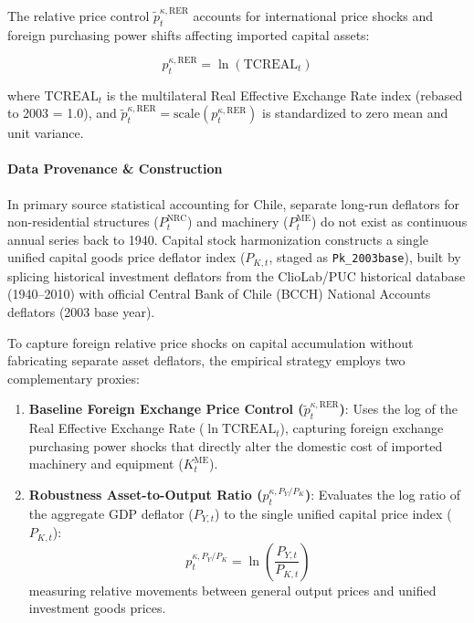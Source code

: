 The relative price control $\tilde{p}_t^{\kappa, \text{RER}}$ accounts for international price shocks and foreign purchasing power shifts affecting imported capital assets:

\begin{equation}
p_t^{\kappa, \text{RER}} = \ln(\text{TCREAL}_t)
\end{equation}

where $\text{TCREAL}_t$ is the multilateral Real Effective Exchange Rate index (rebased to 2003 = 1.0), and $\tilde{p}_t^{\kappa, \text{RER}} = \text{scale}(p_t^{\kappa, \text{RER}})$ is standardized to zero mean and unit variance.

\paragraph{Data Provenance \& Construction}
In primary source statistical accounting for Chile, separate long-run deflators for non-residential structures ($P_t^{\text{NRC}}$) and machinery ($P_t^{\text{ME}}$) do not exist as continuous annual series back to 1940. Capital stock harmonization constructs a single unified capital goods price deflator index ($P_{K,t}$, staged as \texttt{Pk\_2003base}), built by splicing historical investment deflators from the ClioLab/PUC historical database (1940--2010) with official Central Bank of Chile (BCCH) National Accounts deflators (2003 base year).

To capture foreign relative price shocks on capital accumulation without fabricating separate asset deflators, the empirical strategy employs two complementary proxies:
\begin{enumerate}
    \item \textbf{Baseline Foreign Exchange Price Control ($\tilde{p}_t^{\kappa, \text{RER}}$)}: Uses the log of the Real Effective Exchange Rate ($\ln\text{TCREAL}_t$), capturing foreign exchange purchasing power shocks that directly alter the domestic cost of imported machinery and equipment ($K_t^{\text{ME}}$).
    \item \textbf{Robustness Asset-to-Output Ratio ($p_t^{\kappa, P_Y/P_K}$)}: Evaluates the log ratio of the aggregate GDP deflator ($P_{Y,t}$) to the single unified capital price index ($P_{K,t}$):
    \begin{equation}
    p_t^{\kappa, P_Y/P_K} = \ln\left(\frac{P_{Y,t}}{P_{K,t}}\right)
    \end{equation}
    measuring relative movements between general output prices and unified investment goods prices.
\end{enumerate}

